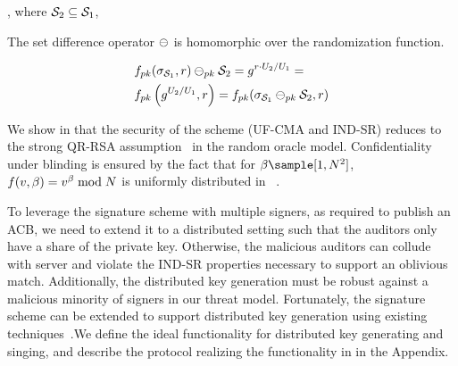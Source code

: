 , where $\genericSetVar[2] \subseteq \genericSetVar[1]$, 


\item {} The set difference operator $\sigMinus$ is homomorphic over the randomization function.    


\begin{align*} 
& \randomizeFn[\pubKey](\genericSig[\genericSetVar[1]], \genericRand) 
\sigMinus[\pubKey] \genericSetVar[2] = \qrGen^{\genericRand \fieldMult \accSet[2]/\accSet[1]}  = \\
&\randomizeFn[\pubKey]\left(\qrGen^{\accSet[2]/\accSet[1]}, \genericRand\right) = \randomizeFn[\pubKey](\genericSig[\genericSetVar[1]] \sigMinus[\pubKey] \genericSetVar[2], \genericRand)
\end{align*}

\itemListEnd

We show in  that the security of the scheme (UF-CMA and IND-SR) reduces to the 
strong QR-RSA assumption~\cite{cramer2000signature} in the random oracle model. Confidentiality under blinding is ensured by the fact that for $\blindingFactor \sample [1, \rsaMod^2]$, $\randomizeFn(\genericSigPair[1], \blindingFactor) = \genericSigPair[1]^{\blindingFactor} \bmod \rsaMod$ is uniformly distributed in \qrGroup~\cite{micciancio2005rsa}. 



%
To leverage the signature scheme with multiple signers, as required to publish an ACB, we need to extend it to a distributed setting such that the auditors only have a share of the private key. Otherwise, the malicious auditors can collude with server and violate the IND-SR properties necessary to support an oblivious match. Additionally, the distributed key generation must be robust against a malicious minority of signers in our threat model. Fortunately, the signature scheme can be extended to support distributed key generation using existing techniques~\cite{algesheimer2002efficient}.We define the ideal functionality \distSigningFunc for distributed key generating and singing, and describe the protocol realizing the functionality in  in the Appendix. 


